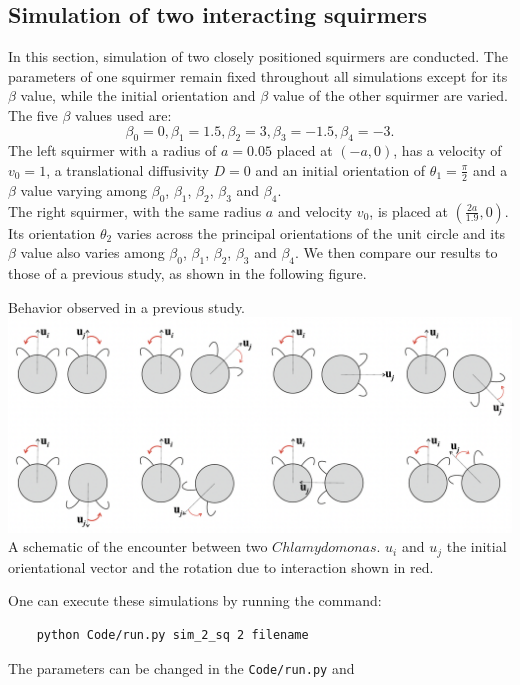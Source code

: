 \documentclass{article}
\begin{document}
\subsection{Simulation of two interacting squirmers}
In this section, simulation of two closely positioned squirmers are conducted. 
The parameters of one squirmer remain fixed throughout all simulations except for its $\beta$ value, while 
the initial orientation and $\beta$ value of the other squirmer are varied. The five $\beta$ values used are:
$$\beta_0 = 0, \beta_1 = 1.5, \beta_2 = 3, \beta_3 = -1.5, \beta_4 = -3.$$ 
The left squirmer with a radius of $a=0.05$ placed at $(-a, 0)$, has a velocity of $v_0=1$, a translational diffusivity $D=0$ and an initial orientation
of $\theta_1 = \frac{\pi}{2}$ and a $\beta$ value varying among $\beta_0$, $\beta_1$, $\beta_2$, $\beta_3$ and $\beta_4$.\\
The right squirmer, with the same radius $a$ and velocity $v_0$, is placed at $(\frac{2a}{1.9}, 0)$. Its orientation $\theta_2$
varies across the principal orientations of the unit circle and its $\beta$ value also varies among $\beta_0$, $\beta_1$, $\beta_2$, $\beta_3$ and $\beta_4$.
We then compare our results to those of a previous study, as shown in the following figure\cite{Stark}.
\begin{center}
    Behavior observed in a previous study.
    \includegraphics[width=1\textwidth]{Presentation/images/stark_behavior.png}\\
    A schematic of the encounter between two $Chlamydomonas$. 
    $u_i$ and $u_j$ the initial orientational vector and the rotation due to interaction shown in red.  
 \end{center}
 One can execute these simulations by running the command:
 \begin{verbatim}
    python Code/run.py sim_2_sq 2 filename
 \end{verbatim}
 The parameters can be changed in the \texttt{Code/run.py} and \\
\end{document}
